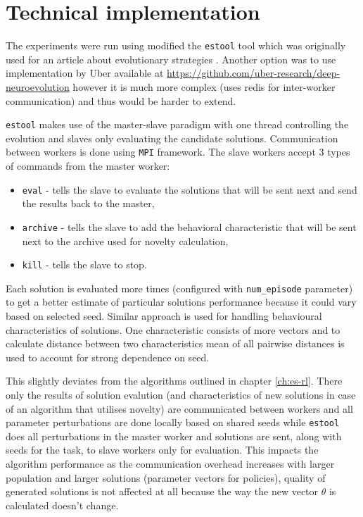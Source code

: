 \chapter{Technical implementation}

The experiments were run using modified the \texttt{estool} tool which was originally used for an article about evolutionary strategies \cite{ha2017evolving}. Another option was to use implementation by Uber available at \url{https://github.com/uber-research/deep-neuroevolution} however it is much more complex (uses redis for inter-worker communication) and thus would be harder to extend.

\texttt{estool} makes use of the master-slave paradigm with one thread controlling the evolution and slaves only evaluating the candidate solutions. Communication between workers is done using \texttt{MPI} framework. The slave workers accept 3 types of commands from the master worker: \begin{itemize}
    \item \texttt{eval} - tells the slave to evaluate the solutions that will be sent next and send the results back to the master,
    \item \texttt{archive} - tells the slave to add the behavioral characteristic that will be sent next to the archive used for novelty calculation,
    \item \texttt{kill} - tells the slave to stop.
\end{itemize}

Each solution is evaluated more times (configured with \texttt{num\_episode} parameter) to get a better estimate of particular solutions performance because it could vary based on selected seed. Similar approach is used for handling behavioural characteristics of solutions. One characteristic consists of more vectors and to calculate distance between two characteristics mean of all pairwise distances is used to account for strong dependence on seed.

 This slightly deviates from the algorithms outlined in chapter \ref{ch:es-rl}. There only the results of solution evalution (and characteristics of new solutions in case of an algorithm that utilises novelty) are communicated between workers and all parameter perturbations are done locally based on shared seeds while \texttt{estool} does all perturbations in the master worker and solutions are sent, along with seeds for the task, to slave workers only for evaluation. This impacts the algorithm performance as the communication overhead increases with larger population and larger solutions (parameter vectors for policies), quality of generated solutions is not affected at all because the way the new vector $\theta$ is calculated doesn't change.